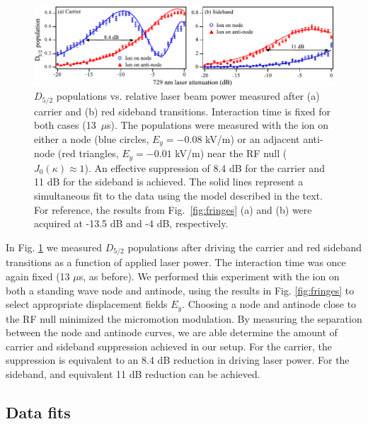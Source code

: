 \begin{figure}[tbh]
    \begin{center}
        \includegraphics{figures/4/Fig_powerdb}
        \caption{\label{fig:PowerScans} $D_{5/2}$ populations vs. relative laser beam power measured after (a) carrier and (b) red sideband transitions. Interaction time is fixed for both cases (13~$\mu$s). The populations were measured with the ion on either a node (blue circles, $E_y = -0.08$ kV/m) or an adjacent anti-node (red triangles, $E_y = -0.01$ kV/m) near the RF null ($J_0(\kappa) \approx 1$). An effective suppression of 8.4 dB for the carrier and 11 dB for the sideband is achieved. The solid lines represent a simultaneous fit to the data using the model described in the text. For reference, the results from Fig.~\ref{fig:fringes} (a) and (b) were acquired at -13.5 dB and -4 dB, respectively.}
    \end{center}
\end{figure}

In Fig. \ref{fig:PowerScans} we measured $D_{5/2}$ populations after driving the carrier and red sideband transitions as a function of applied laser power. The interaction time was once again fixed (13 $\mu$s, as before). We performed this experiment with the ion on both a standing wave node and antinode, using the results in Fig. \ref{fig:fringes} to select appropriate displacement fields $E_y$. Choosing a node and antinode close to the RF null minimized the micromotion modulation. By measuring the separation between the node and antinode curves, we are able determine the amount of carrier and sideband suppression achieved in our setup. For the carrier, the suppression is equivalent to an 8.4 dB reduction in driving laser power. For the sideband, and equivalent 11 dB reduction can be achieved. 



\subsection{Data fits}

